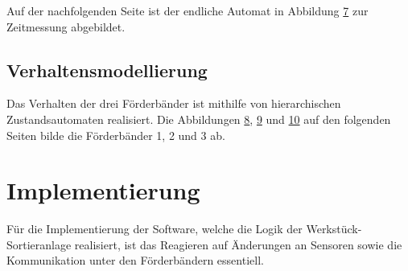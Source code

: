 \documentclass[a4paper, 11pt]{article}
\begin{document}
\noindent Auf der nachfolgenden Seite ist der endliche Automat in Abbildung \hyperref[sec:timemeasure]{7} zur Zeitmessung abgebildet.

\label{sec:timemeasure}

\newpage

\subsection{Verhaltensmodellierung}
Das Verhalten der drei Förderbänder ist mithilfe von hierarchischen Zustandsautomaten realisiert. Die Abbildungen \hyperref[sec:hsm1]{8}, \hyperref[sec:hsm2]{9} und \hyperref[sec:hsm3]{10} auf den folgenden Seiten bilde die Förderbänder 1, 2 und 3 ab.

\newpage

\label{sec:hsm1}

\newpage

\label{sec:hsm2}

\newpage

\label{sec:hsm3}

\newpage



\setcounter{imgcounter}{10}


\section{Implementierung}
Für die Implementierung der Software, welche die Logik der Werkstück-Sortieranlage realisiert, ist das Reagieren auf Änderungen an Sensoren sowie die Kommunikation unter den Förderbändern essentiell.
\end{document}
